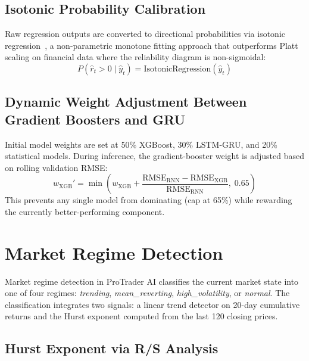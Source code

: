\documentclass[10pt,a4paper,twoside]{article}
\begin{document}
\subsection{Isotonic Probability Calibration}

Raw regression outputs are converted to directional probabilities via isotonic
regression~\cite{zadrozny2002}, a non-parametric monotone fitting approach
that outperforms Platt scaling on financial data where the reliability diagram
is non-sigmoidal:
\begin{equation}
  P(\hat{r}_t > 0 \mid \hat{y}_t) = \text{IsotonicRegression}(\hat{y}_t)
\end{equation}

\subsection{Dynamic Weight Adjustment Between Gradient Boosters and GRU}

Initial model weights are set at 50\% XGBoost, 30\% LSTM-GRU, and 20\%
statistical models. During inference, the gradient-booster weight is adjusted
based on rolling validation RMSE:
\begin{equation}
  w_{\text{XGB}}' = \min\!\left(w_{\text{XGB}}
  + \frac{\text{RMSE}_{\text{RNN}} - \text{RMSE}_{\text{XGB}}}
         {\text{RMSE}_{\text{RNN}}},\; 0.65\right)
\end{equation}
This prevents any single model from dominating (cap at 65\%) while rewarding
the currently better-performing component.

\section{Market Regime Detection}
\label{sec:regime}

Market regime detection in ProTrader AI classifies the current market state
into one of four regimes: \emph{trending}, \emph{mean\_reverting},
\emph{high\_volatility}, or \emph{normal}. The classification integrates two
signals: a linear trend detector on 20-day cumulative returns and the Hurst
exponent computed from the last 120 closing prices.

\subsection{Hurst Exponent via R/S Analysis}
\end{document}
